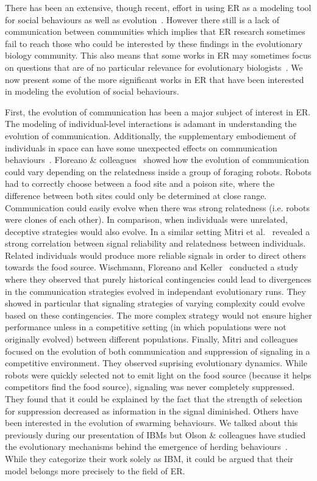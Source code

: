         There has been an extensive, though recent, effort in using ER as a modeling tool for social behaviours as well as evolution~\parencite{Mitri2012, Trianni2014b, Eiben2014, Doncieux2015a}. However there still is a lack of communication between communities which implies that ER research sometimes fail to reach those who could be interested by these findings in the evolutionary biology community. This also means that some works in ER may sometimes focus on questions that are of no particular relevance for evolutionary biologists~\parencite{Trianni2014b, Doncieux2015a}. We now present some of the more significant works in ER that have been interested in modeling the evolution of social behaviours. 

        First, the evolution of communication has been a major subject of interest in ER. The modeling of individual-level interactions is adamant in understanding the evolution of communication. Additionally, the supplementary embodiement of individuals in space can have some unexpected effects on communication behaviours~\parencite{Mitri2009}. Floreano \& colleagues~\parencite{Floreano2007} showed how the evolution of communication could vary depending on the relatedness inside a group of foraging robots. Robots had to correctly choose between a food site and a poison site, where the difference between both sites could only be determined at close range. Communication could easily evolve when there was strong relatedness (i.e. robots were clones of each other). In comparison, when individuals were unrelated, deceptive strategies would also evolve. In a similar setting Mitri et al.~\parencite{Mitri2011} revealed a strong correlation between signal reliability and relatedness between individuals. Related individuals would produce more reliable signals in order to direct others towards the food source. Wischmann, Floreano and Keller~\parencite{Wischmann2012} conducted a study where they observed that purely historical contingencies could lead to divergences in the communication strategies evolved in independant evolutionary runs. They showed in particular that signaling strategies of varying complexity could evolve based on these contingencies. The more complex strategy would not ensure higher performance unless in a competitive setting (in which populations were not originally evolved) between different populations. Finally, Mitri and colleagues~\parencite{Mitri2009} focused on the evolution of both communication and suppression of signaling in a competitive environment. They observed suprising evolutionary dynamics. While robots were quickly selected not to emit light on the food source (because it helps competitors find the food source), signaling was never completely suppressed. They found that it could be explained by the fact that the strength of selection for suppression decreased as information in the signal diminished. Others have been interested in the evolution of swarming behaviours. We talked about this previously during our presentation of IBMs but Olson \& colleagues have studied the evolutionary mechanisms behind the emergence of herding behaviours~\parencite{Olson2013, Olson2013a, Haley2014}. While they categorize their work solely as IBM, it could be argued that their model belongs more precisely to the field of ER.

